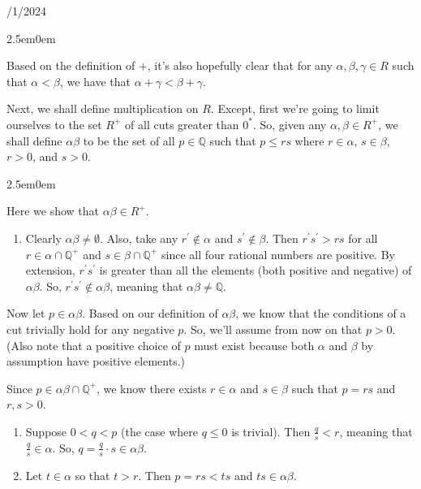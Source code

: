 \documentclass{book}
\newcommand{\hTwo}{%
\color{Black}%
   \fontsize{13}{15}\selectfont%
}
\newcommand{\exTwo}{%
\color{Purple}%
   \fontsize{13}{15}\selectfont%
}
\newenvironment{myIndent}{%
   \begin{adjustwidth}{2.5em}{0em}%
}{%
   \end{adjustwidth}%
}
\newcommand{\myHS}{ \hspace{0.5em}}
\newcommand{\retTwo}{\hfill\bigbreak}
\newcommand{\dispDate}[1]{{
   \color{Black}%
   \fontsize{20}{18}\selectfont%
   #1\retTwo
}}
\begin{document}
   \dispDate{9/1/2024}
   \begin{myIndent}\hTwo
      Based on the definition of $+$, it's also hopefully clear that for any $\alpha, \beta, \gamma \in R$ such that $\alpha < \beta$, we have that $\alpha + \gamma < \beta + \gamma$.\retTwo

      Next, we shall define multiplication on $R$. Except, first we're going to limit ourselves to the set $R^+$ of all cuts greater than $0^*$. So, given any $\alpha, \beta \in R^+$, we shall define $\alpha \beta$ to be the set of all $p \in \mathbb{Q}$ such that $p \leq rs$ where $r \in \alpha$,\myHS $s \in \beta$,\myHS $r > 0$, and $s > 0$.

      \begin{myIndent}\exTwo
         Here we show that $\alpha\beta \in R^+$.
         \begin{enumerate}
            \item Clearly $\alpha\beta \neq \emptyset$. Also, take any $r^\prime \notin \alpha$ and $s^\prime \notin \beta$. Then $r^\prime s^\prime > rs$ for all $r \in \alpha \cap \mathbb{Q}^+$ and $s \in \beta \cap \mathbb{Q}^+$ since all four rational numbers are positive. By extension, $r^\prime s^\prime$ is greater than all the elements (both positive and negative) of $\alpha\beta$. So, $r^\prime s^\prime \notin \alpha\beta$, meaning that $\alpha\beta \neq \mathbb{Q}$.\\ [-9pt]
         \end{enumerate}

         Now let $p \in \alpha\beta$. Based on our definition of $\alpha\beta$, we know that the conditions of a cut trivially hold for any negative $p$. So, we'll assume from now on that $p > 0$. (Also note that a positive choice of $p$ must exist because both $\alpha$ and $\beta$ by assumption have positive elements.)\retTwo

         Since $p \in \alpha\beta \cap \mathbb{Q}^+$, we know there exists $r \in \alpha$ and $s \in \beta$ such that $p = rs$ and $r, s > 0$.

         \begin{enumerate}
            \item[2.] Suppose $0 < q < p$ (the case where $q \leq 0$ is trivial). Then $\frac{q}{s} < r$, meaning that $\frac{q}{s} \in \alpha$. So, $q = \frac{q}{s} \cdot s \in \alpha\beta$.\retTwo
            
            \item[3.] Let $t \in \alpha$ so that $t > r$. Then $p = rs < ts$ and $ts \in \alpha\beta$.\retTwo
         \end{enumerate}
      \end{myIndent}


\end{myIndent}
\end{document}

